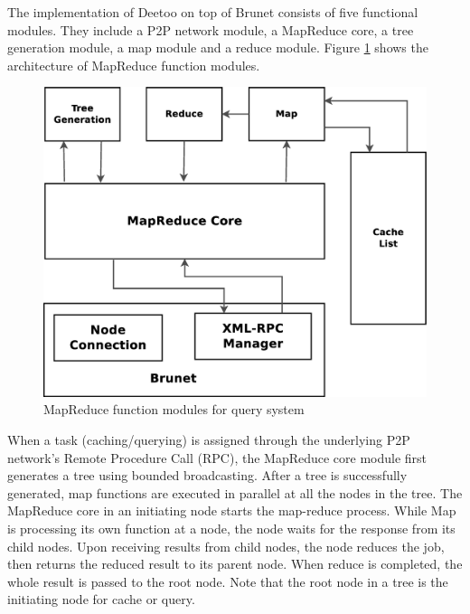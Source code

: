 \documentclass[9.5pt,journal,final,finalsubmission,twocolumn]{IEEEtran}
\begin{document}
%
The implementation of Deetoo on top of Brunet consists of 
five functional modules.
They include a P2P network module, a MapReduce core, a tree generation 
module, a map module
and a reduce module.
Figure \ref{fig:mapreduce} shows the architecture of MapReduce function modules. 
\begin{figure}
\centering
\includegraphics[width=5in]{mapreduce_query_system.eps}
\caption{MapReduce function modules for query system}\label{fig:mapreduce}
\end{figure}
When a task (caching/querying) is assigned through the underlying 
P2P network's Remote Procedure Call (RPC), the MapReduce core module 
first generates a tree using bounded broadcasting. 
After a tree is successfully generated, map functions are executed in 
parallel at all the nodes in the tree. 
The MapReduce core in an initiating node starts the map-reduce process. 
While Map is processing its own function at a node, the node waits for 
the response from its child nodes.
Upon receiving results from child nodes, the node reduces the job, 
then returns the reduced result to its parent node. 
When reduce is completed, the whole result is passed to the root node.
Note that the root node in a tree is the initiating node for cache or query.
\end{document}
